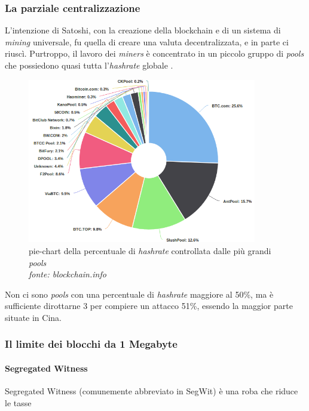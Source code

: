 \documentclass {article}
\begin{document}
\subsubsection {La parziale centralizzazione}


L'intenzione di Satoshi, con la creazione della blockchain e di un sistema di \textit{mining} universale, fu quella di creare una valuta decentralizzata, e in parte ci riuscì.
Purtroppo, il lavoro dei \textit{miners} è concentrato in un piccolo gruppo di \textit{pools} che possiedono quasi tutta l'\textit{hashrate} globale \cite{centralization}.

\vspace {0.5cm}
\begin{figure}[htb!]
\includegraphics [width = 10cm] {pools.png}
\centering
\captionsetup{width=1.4\linewidth}
\caption {pie-chart della percentuale di \textit{hashrate} controllata dalle più grandi \textit{pools}\\\textit{fonte: blockchain.info}}
\end{figure}
\vspace {0.2cm}
\noindent
%
Non ci sono \textit{pools} con una percentuale di \textit{hashrate} maggiore al 50\%, ma è sufficiente dirottarne 3 per compiere un attacco 51\%, essendo la maggior parte situate in Cina.


\subsubsection {Il limite dei blocchi da 1 Megabyte}



\paragraph {Segregated Witness}

Segregated Witness (comunemente abbreviato in SegWit) è una roba che riduce le tasse
\end{document}
